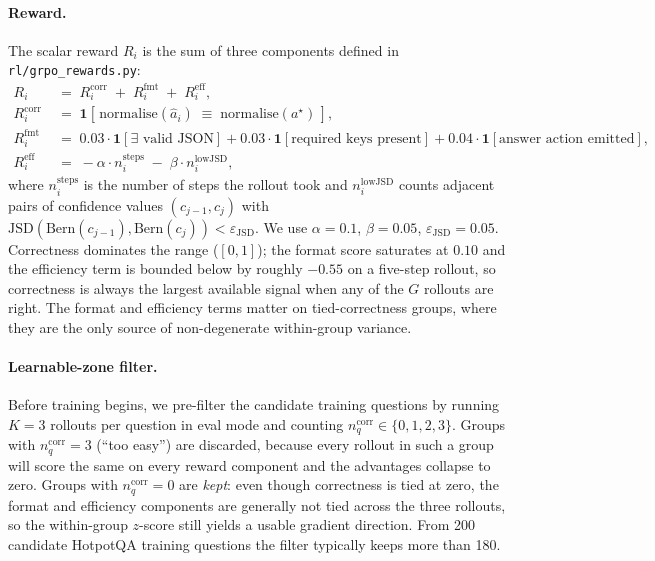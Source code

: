 \documentclass[11pt]{article}
\begin{document}
\paragraph{Reward.}
The scalar reward $R_i$ is the sum of three components defined in
\texttt{rl/grpo\_rewards.py}:
\begin{align}
  R_i \;&=\; R^{\mathrm{corr}}_i \;+\; R^{\mathrm{fmt}}_i \;+\; R^{\mathrm{eff}}_i, \\
  R^{\mathrm{corr}}_i \;&=\; \mathbf{1}\!\left[\,\text{normalise}(\hat a_i) \;\equiv\; \text{normalise}(a^\star)\,\right], \\
  R^{\mathrm{fmt}}_i  \;&=\; 0.03\cdot\mathbf{1}[\exists\text{ valid JSON}] + 0.03\cdot\mathbf{1}[\text{required keys present}] + 0.04\cdot\mathbf{1}[\text{answer action emitted}], \\
  R^{\mathrm{eff}}_i  \;&=\; -\alpha \cdot n^{\mathrm{steps}}_i \;-\; \beta \cdot n^{\mathrm{lowJSD}}_i,
\end{align}
where $n^{\mathrm{steps}}_i$ is the number of steps the rollout took
and $n^{\mathrm{lowJSD}}_i$ counts adjacent pairs of confidence values
$(c_{j-1}, c_j)$ with $\mathrm{JSD}(\mathrm{Bern}(c_{j-1}), \mathrm{Bern}(c_j)) < \varepsilon_{\mathrm{JSD}}$. We use
$\alpha = 0.1$, $\beta = 0.05$, $\varepsilon_{\mathrm{JSD}} = 0.05$.
Correctness dominates the range ($[0, 1]$); the format score saturates
at $0.10$ and the efficiency term is bounded below by roughly $-0.55$
on a five-step rollout, so correctness is always the largest available
signal when any of the $G$ rollouts are right. The format and
efficiency terms matter on tied-correctness groups, where they are the
only source of non-degenerate within-group variance.

\paragraph{Learnable-zone filter.}
Before training begins, we pre-filter the candidate training questions
by running $K=3$ rollouts per question in eval mode and counting
$n^{\mathrm{corr}}_q \in \{0, 1, 2, 3\}$. Groups with
$n^{\mathrm{corr}}_q = 3$ (``too easy'') are discarded, because every
rollout in such a group will score the same on every reward component
and the advantages collapse to zero. Groups with $n^{\mathrm{corr}}_q = 0$
are \emph{kept}: even though correctness is tied at zero, the format
and efficiency components are generally not tied across the three
rollouts, so the within-group $z$-score still yields a usable gradient
direction. From 200 candidate HotpotQA training questions the filter
typically keeps more than 180.
\end{document}
